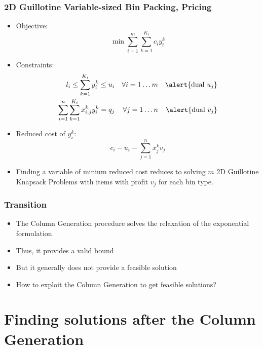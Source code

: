 \documentclass[10pt]{beamer}
\begin{document}
\begin{frame}
  \frametitle{2D Guillotine Variable-sized Bin Packing, Pricing}
  
  \begin{itemize}
    \item Objective:
      \begin{displaymath}
        \min \sum_{i = 1}^m \sum_{k = 1}^{K_i} c_i y_i^k
      \end{displaymath}

    \item Constraints:
      \begin{align*}
        l_i \le \sum_{k = 1}^{K_i} y_i^k \le u_i && \forall i = 1 \dots m && \alert{\text{dual } u_j} \\
        \sum_{i = 1}^n \sum_{k = 1}^{K_i} x_{i, j}^k y_i^k = q_j && \forall j = 1 \dots n && \alert{\text{dual } v_j} \\
      \end{align*}

    \item \pause Reduced cost of $y_i^k$:
      \begin{displaymath}
        c_i - u_i - \sum_{j = 1}^n x_j^k v_j
      \end{displaymath}

    \item \pause Finding a variable of minium reduced cost reduces to solving $m$ 2D Guillotine Knapsack Problems with items with profit $v_j$ for each bin type.
  \end{itemize}
\end{frame}

\begin{frame}
  \frametitle{Transition}

  \begin{itemize}
    \item The Column Generation procedure solves the relaxation of the exponential formulation
    \item \pause Thus, it provides a valid bound
    \item \pause But it generally does not provide a feasible solution
    \item \pause How to exploit the Column Generation to get feasible solutions?
  \end{itemize}
\end{frame}

\section{Finding solutions after the Column Generation}
\end{document}

